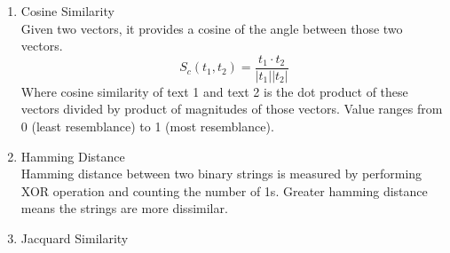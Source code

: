 \documentclass{article}
\begin{document}
    \begin{enumerate}
        \item Cosine Similarity \\ Given two vectors, it provides a cosine of the angle between those two vectors.
        $$S_c (t_1, t_2) = \frac{t_1 \cdot t_2}{|t_1||t_2|}$$ Where cosine similarity of text 1 and text 2 is the dot product of these vectors divided by product of magnitudes of those vectors. Value ranges from 0 (least resemblance) to 1 (most resemblance).

        \item Hamming Distance \\ Hamming distance between two binary strings is measured by performing XOR operation and counting the number of 1s. Greater hamming distance means the strings are more dissimilar. 
        \item Jacquard Similarity
    \end{enumerate}
\end{document}

